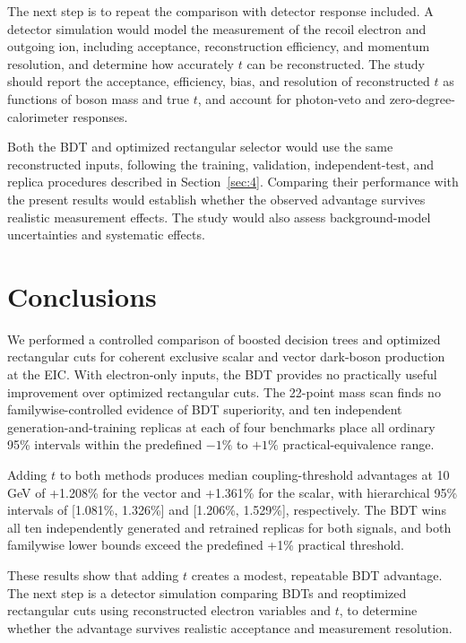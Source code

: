 \documentclass[particles,article,submit,moreauthors,pdftex]{Definitions/mdpi}
\begin{document}
The next step is to repeat the comparison with detector response included. A detector simulation would model the measurement of the recoil electron and outgoing ion, including acceptance, reconstruction efficiency, and momentum resolution, and determine how accurately $t$ can be reconstructed. The study should report the acceptance, efficiency, bias, and resolution of reconstructed $t$ as functions of boson mass and true $t$, and account for photon-veto and zero-degree-calorimeter responses.

Both the BDT and optimized rectangular selector would use the same reconstructed inputs, following the training, validation, independent-test, and replica procedures described in Section~\ref{sec:4}. Comparing their performance with the present results would establish whether the observed advantage survives realistic measurement effects. The study would also assess background-model uncertainties and systematic effects.

\section{Conclusions}\label{sec:7}

We performed a controlled comparison of boosted decision trees and optimized rectangular cuts for coherent exclusive scalar and vector dark-boson production at the EIC. With electron-only inputs, the BDT provides no practically useful improvement over optimized rectangular cuts. The 22-point mass scan finds no familywise-controlled evidence of BDT superiority, and ten independent generation-and-training replicas at each of four benchmarks place all ordinary 95\% intervals within the predefined $-1\%$ to $+1\%$ practical-equivalence range.

Adding $t$ to both methods produces median coupling-threshold advantages at 10 GeV of +1.208\% for the vector and +1.361\% for the scalar, with hierarchical 95\% intervals of [1.081\%, 1.326\%] and [1.206\%, 1.529\%], respectively. The BDT wins all ten independently generated and retrained replicas for both signals, and both familywise lower bounds exceed the predefined +1\% practical threshold.

These results show that adding $t$ creates a modest, repeatable BDT advantage. The next step is a detector simulation comparing BDTs and reoptimized rectangular cuts using reconstructed electron variables and $t$, to determine whether the advantage survives realistic acceptance and measurement resolution.
\end{document}
